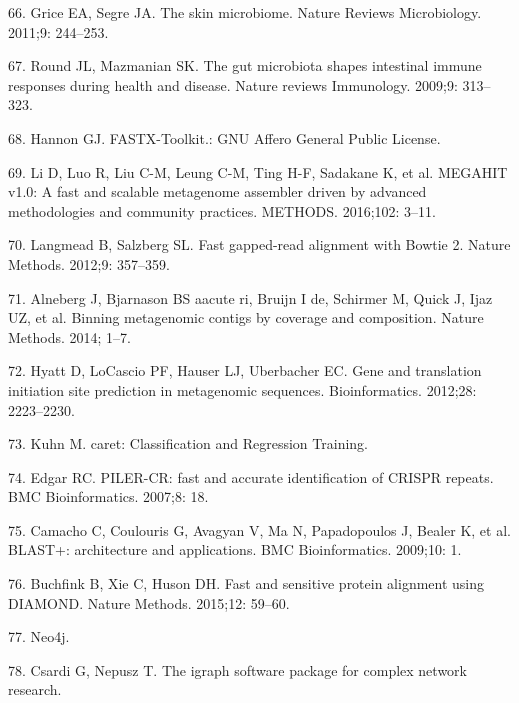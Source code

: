\documentclass[12pt,]{article}
\begin{document}
\hypertarget{ref-Grice:2011gy}{}
66. Grice EA, Segre JA. The skin microbiome. Nature Reviews
Microbiology. 2011;9: 244--253.

\hypertarget{ref-Round:2009bz}{}
67. Round JL, Mazmanian SK. The gut microbiota shapes intestinal immune
responses during health and disease. Nature reviews Immunology. 2009;9:
313--323.

\hypertarget{ref-FASTXToolkit:wr}{}
68. Hannon GJ. FASTX-Toolkit.: GNU Affero General Public License.

\hypertarget{ref-Li:2016kd}{}
69. Li D, Luo R, Liu C-M, Leung C-M, Ting H-F, Sadakane K, et al.
MEGAHIT v1.0: A fast and scalable metagenome assembler driven by
advanced methodologies and community practices. METHODS. 2016;102:
3--11.

\hypertarget{ref-Langmead:2012jh}{}
70. Langmead B, Salzberg SL. Fast gapped-read alignment with Bowtie 2.
Nature Methods. 2012;9: 357--359.

\hypertarget{ref-Alneberg:2014fc}{}
71. Alneberg J, Bjarnason BS aacute ri, Bruijn I de, Schirmer M, Quick
J, Ijaz UZ, et al. Binning metagenomic contigs by coverage and
composition. Nature Methods. 2014; 1--7.

\hypertarget{ref-Hyatt:2012cy}{}
72. Hyatt D, LoCascio PF, Hauser LJ, Uberbacher EC. Gene and translation
initiation site prediction in metagenomic sequences. Bioinformatics.
2012;28: 2223--2230.

\hypertarget{ref-caretClassificatio:ux5fU2Litux5f1}{}
73. Kuhn M. caret: Classification and Regression Training.

\hypertarget{ref-Edgar:2007bh}{}
74. Edgar RC. PILER-CR: fast and accurate identification of CRISPR
repeats. BMC Bioinformatics. 2007;8: 18.

\hypertarget{ref-Camacho:2009fc}{}
75. Camacho C, Coulouris G, Avagyan V, Ma N, Papadopoulos J, Bealer K,
et al. BLAST+: architecture and applications. BMC Bioinformatics.
2009;10: 1.

\hypertarget{ref-Buchfink:2015ki}{}
76. Buchfink B, Xie C, Huson DH. Fast and sensitive protein alignment
using DIAMOND. Nature Methods. 2015;12: 59--60.

\hypertarget{ref-Neoj:Fuwr6PBN}{}
77. Neo4j.

\hypertarget{ref-Theigraphsoftware:vh}{}
78. Csardi G, Nepusz T. The igraph software package for complex network
research.
\end{document}
